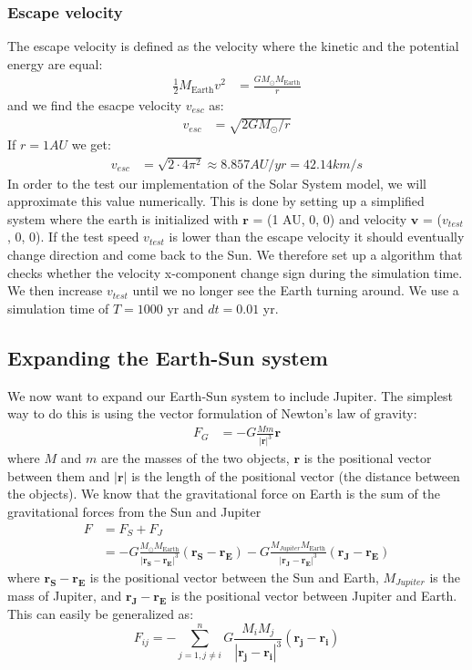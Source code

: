 \documentclass[american,a4paper,12pt]{article}
\renewcommand{\vec}[1]{\mathbf{#1}} %
\newcommand{\ME}{\ensuremath{M_{\text{Earth}}}} %
\newcommand{\MS}{\ensuremath{M_{\odot}}} %
\begin{document}
\subsubsection{Escape velocity}
The escape velocity is defined as the velocity where the kinetic and the potential energy are equal:
\begin{align*}
    \frac{1}{2} \ME v^2 &= \frac{G \MS \ME}{r}
\end{align*}
and we find the esacpe velocity $v_{esc}$ as: 
\begin{align*}
    v_{esc} &= \sqrt{2 G \MS /r}
\end{align*}
If $r = 1 AU$ we get:
\begin{align*}
    v_{esc} &= \sqrt{2 \cdot 4 \pi^2} \approx 8.857 AU/yr = 42.14 km/s
\end{align*}
In order to the test our implementation of the Solar System model, we will approximate this value numerically. This is done by setting up a simplified system where the earth is initialized with $\vec{r}$ = (1 AU, 0, 0) and velocity $\vec{v}$ = ($v_{test}$, 0, 0). If the test speed $v_{test}$ is lower than the escape velocity it should eventually change direction and come back to the Sun. We therefore set up a algorithm that checks whether the velocity x-component change sign during the simulation time. We then increase $v_{test}$ until we no longer see the Earth turning around. We use a simulation time of $T = 1000$ yr and $dt = 0.01$ yr. 

\subsection{Expanding the Earth-Sun system}
We now want to expand our Earth-Sun system to include Jupiter. The simplest way to do this is using the vector formulation of Newton's law of gravity:
\begin{align*}
    F_G &= -G \frac{M m}{|\vec{r}|^3}\vec{r}
\end{align*}
where $M$ and $m$ are the masses of the two objects, $\vec{r}$ is the positional vector between them and $|\vec{r}|$ is the length of the positional vector (the distance between the objects).
\newpage
We know that the gravitational force on Earth is the sum of the gravitational forces from the Sun and Jupiter
\begin{align*}
    F &= F_S + F_J\\
    &= -G \frac{\MS \ME}{|\vec{r_S}-\vec{r_E}|^3}(\vec{r_S}-\vec{r_E}) -G \frac{M_{Jupiter} \ME}{|\vec{r_J}-\vec{r_E}|^3}(\vec{r_J}-\vec{r_E})
\end{align*}
where $\vec{r_S}-\vec{r_E}$ is the positional vector between the Sun and Earth, $M_{Jupiter}$ is the mass of Jupiter, and $\vec{r_J}-\vec{r_E}$ is the positional vector between Jupiter and Earth. This can easily be generalized as:
\begin{equation}
    F_{ij} = -\sum_{j=1,j\neq i}^n G \frac{M_i M_j}{|\vec{r_j} - \vec{r_i}|^3}(\vec{r_j}-\vec{r_i})
    \label{eq:Fij}    
\end{equation}
\end{document}
